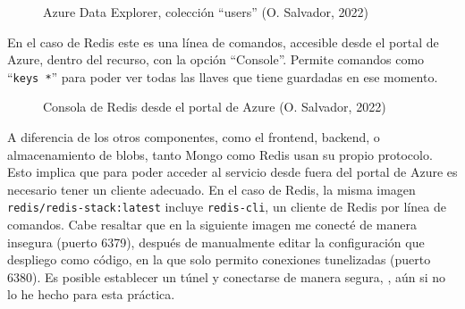\documentclass[11pt]{article}
\begin{document}
\begin{flushleft}
		\begin{figure}[htb]
			\centering
			\caption{Azure Data Explorer, colección ``users'' (O. Salvador, 2022)}
		\end{figure}
		
	En el caso de Redis este es una línea de comandos, accesible desde el portal de Azure, dentro del recurso, con la opción ``Console''. Permite comandos como ``\texttt{keys *}'' para poder ver todas las llaves que tiene guardadas en ese momento. 
	\linebreak
	
		\begin{figure}[htb]
			\centering
			\caption{Consola de Redis desde el portal de Azure (O. Salvador, 2022)}
			\label{consola_redis}
		\end{figure}
	
	
	\clearpage
	A diferencia de los otros componentes, como el frontend, backend, o almacenamiento de blobs, tanto Mongo como Redis usan su propio protocolo. Esto implica que para poder acceder al servicio desde fuera del portal de Azure es necesario tener un cliente adecuado. En el caso de Redis, la misma imagen \texttt{redis/redis-stack:latest} incluye \texttt{redis-cli}, un cliente de Redis por línea de comandos. Cabe resaltar que en la siguiente imagen me conecté de manera insegura (puerto 6379), después de manualmente editar la configuración que despliego como código, en la que solo permito conexiones tunelizadas (puerto 6380). Es posible establecer un túnel y conectarse de manera segura, \cite{redis_connect}, aún si no lo he hecho para esta práctica.
	\linebreak
	

\end{flushleft}
\end{document}
